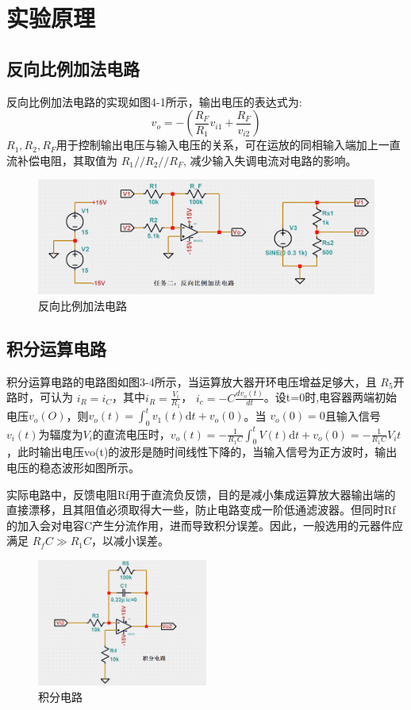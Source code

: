 \documentclass[a4paper]{article}
\theoremstyle{definition}
\theoremstyle{plain}
\theoremstyle{remark}
\begin{document}
\section{实验原理}
\subsection{反向比例加法电路}
反向比例加法电路的实现如图4-1所示，输出电压的表达式为:
\begin{equation}
	v_{o}=-(\frac{R_{F}}{R_1}v_{i1}+\frac{R_{F}}{v_{i2}})
\end{equation}
$R_1, R_2, R_{F}$用于控制输出电压与输入电压的关系，可在运放的同相输入端加上一直流补偿电阻，其取值为 $R_1//R_2//R_{F}$, 减少输入失调电流对电路的影响。

\begin{figure}[H]
	\centering
	\includegraphics[width=1\textwidth]{反向比例加法电路}
	\caption{反向比例加法电路}
\end{figure}

\subsection{积分运算电路}
积分运算电路的电路图如图3-4所示，当运算放大器开环电压增益足够大，且 $R_5$开路时，可认为 $i_{R}=i_{C}$，其中$i_R=\frac{V_i}{R_1}$， $i_c=-C \frac{dv_o(t)}{dt}$。设t=0时,电容器两端初始电压$v_o(O)$，则$v_o (t)=\int_{0}^{t} v_1(t) \mathrm{d}t+v_{o}(0)$。当 $v_o(0)=0$且输入信号$v_i(t)$为辐度为$V_i$的直流电压时，$v_o(t)=-\frac{1}{R_1C} \int_{0}^{t} V(t) \mathrm{d}t+v_o(0)=-\frac{1}{R_1C}V_it$，此时输出电压vo(t)的波形是随时间线性下降的，当输入信号为正方波时，输出电压的稳态波形如图所示。

实际电路中，反馈电阻Rf用于直流负反馈，目的是减小集成运算放大器输出端的直接漂移，且其阻值必须取得大一些，防止电路变成一阶低通滤波器。但同时Rf的加入会对电容C产生分流作用，进而导致积分误差。因此，一般选用的元器件应满足 $R_{f}C \gg R_1C$，以减小误差。

\begin{figure}[H]
	\centering
	\includegraphics[width=0.5\textwidth]{积分电路}
	\caption{积分电路}
\end{figure}
\end{document}
